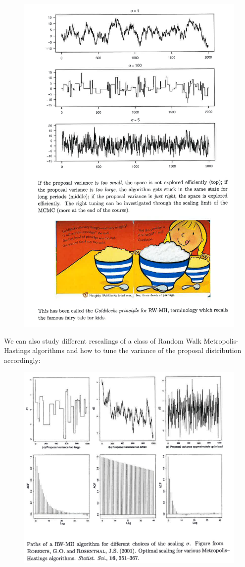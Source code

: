 \documentclass{article}
\begin{document}
	\begin{figure}[H]
		\centering
		\includegraphics[width=0.67\linewidth]{drawings/goldilocks.png}
	\end{figure}
	We can also study different rescalings of a class of Random Walk Metropolis-Hastings algorithms and how to tune the variance of the proposal distribution accordingly:
	\begin{figure}[H]
		\centering
		\includegraphics[width=1\linewidth]{drawings/variousrescalings.png}
	\end{figure}
\end{document}
